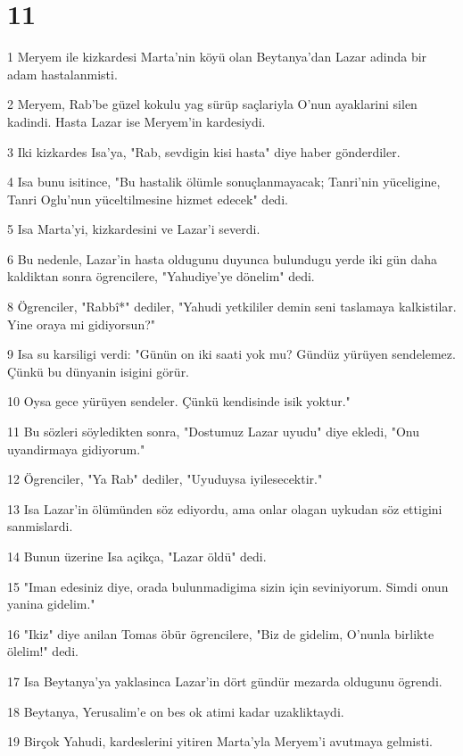 \chapter{11}

\par 1 Meryem ile kizkardesi Marta'nin köyü olan Beytanya'dan Lazar adinda bir adam hastalanmisti.
\par 2 Meryem, Rab'be güzel kokulu yag sürüp saçlariyla O'nun ayaklarini silen kadindi. Hasta Lazar ise Meryem'in kardesiydi.
\par 3 Iki kizkardes Isa'ya, "Rab, sevdigin kisi hasta" diye haber gönderdiler.
\par 4 Isa bunu isitince, "Bu hastalik ölümle sonuçlanmayacak; Tanri'nin yüceligine, Tanri Oglu'nun yüceltilmesine hizmet edecek" dedi.
\par 5 Isa Marta'yi, kizkardesini ve Lazar'i severdi.
\par 6 Bu nedenle, Lazar'in hasta oldugunu duyunca bulundugu yerde iki gün daha kaldiktan sonra ögrencilere, "Yahudiye'ye dönelim" dedi.
\par 8 Ögrenciler, "Rabbî*" dediler, "Yahudi yetkililer demin seni taslamaya kalkistilar. Yine oraya mi gidiyorsun?"
\par 9 Isa su karsiligi verdi: "Günün on iki saati yok mu? Gündüz yürüyen sendelemez. Çünkü bu dünyanin isigini görür.
\par 10 Oysa gece yürüyen sendeler. Çünkü kendisinde isik yoktur."
\par 11 Bu sözleri söyledikten sonra, "Dostumuz Lazar uyudu" diye ekledi, "Onu uyandirmaya gidiyorum."
\par 12 Ögrenciler, "Ya Rab" dediler, "Uyuduysa iyilesecektir."
\par 13 Isa Lazar'in ölümünden söz ediyordu, ama onlar olagan uykudan söz ettigini sanmislardi.
\par 14 Bunun üzerine Isa açikça, "Lazar öldü" dedi.
\par 15 "Iman edesiniz diye, orada bulunmadigima sizin için seviniyorum. Simdi onun yanina gidelim."
\par 16 "Ikiz" diye anilan Tomas öbür ögrencilere, "Biz de gidelim, O'nunla birlikte ölelim!" dedi.
\par 17 Isa Beytanya'ya yaklasinca Lazar'in dört gündür mezarda oldugunu ögrendi.
\par 18 Beytanya, Yerusalim'e on bes ok atimi kadar uzakliktaydi.
\par 19 Birçok Yahudi, kardeslerini yitiren Marta'yla Meryem'i avutmaya gelmisti.
